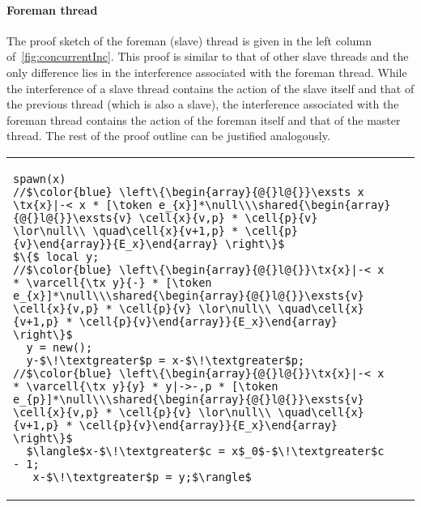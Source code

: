 \paragraph{Foreman thread} The proof sketch of the foreman (slave) thread is given in the left column of~\fig\ref{fig:concurrentInc}. This proof is similar to that of other slave threads and the only difference lies in the interference associated with the foreman thread. While the interference of a slave thread contains the action of the slave itself and that of the previous thread (which is also a slave), the interference associated with the foreman thread contains the action of the foreman itself and that of the master thread. The rest of the proof outline can be justified analogously. 
%
%
{\smaller
\begin{tabular}{@{} l @{\hspace{4ex}} l@{}}
{\begin{lstlisting}
spawn(x)
//$\color{blue} \left\{\begin{array}{@{}l@{}}\exsts x \tx{x}|-< x * [\token e_{x}]*\null\\\shared{\begin{array}{@{}l@{}}\exsts{v} \cell{x}{v,p} * \cell{p}{v} \lor\null\\ \quad\cell{x}{v+1,p} * \cell{p}{v}\end{array}}{E_x}\end{array} \right\}$
$\{$ local y;
//$\color{blue} \left\{\begin{array}{@{}l@{}}\tx{x}|-< x * \varcell{\tx y}{-} * [\token e_{x}]*\null\\\shared{\begin{array}{@{}l@{}}\exsts{v} \cell{x}{v,p} * \cell{p}{v} \lor\null\\ \quad\cell{x}{v+1,p} * \cell{p}{v}\end{array}}{E_x}\end{array} \right\}$
  y = new();
  y-$\!\textgreater$p = x-$\!\textgreater$p;
//$\color{blue} \left\{\begin{array}{@{}l@{}}\tx{x}|-< x * \varcell{\tx y}{y} * y|->-,p * [\token e_{p}]*\null\\\shared{\begin{array}{@{}l@{}}\exsts{v} \cell{x}{v,p} * \cell{p}{v} \lor\null\\ \quad\cell{x}{v+1,p} * \cell{p}{v}\end{array}}{E_x}\end{array} \right\}$
  $\langle$x-$\!\textgreater$c = x$_0$-$\!\textgreater$c - 1;
   x-$\!\textgreater$p = y;$\rangle$

\end{lstlisting}}
\end{tabular}}
